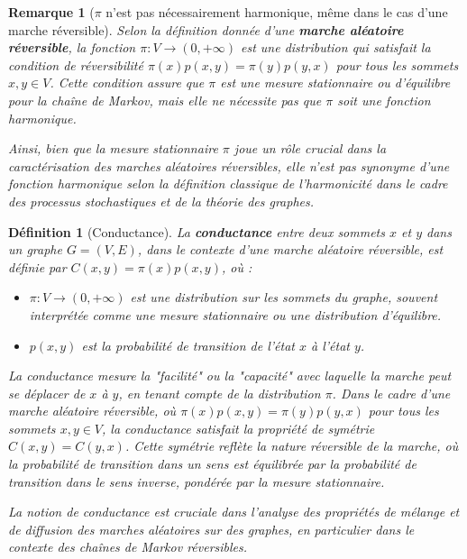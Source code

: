 \documentclass{article}
\theoremstyle{pasdepoint}
\newtheorem{definition}{Définition}
\theoremstyle{break}
\theoremstyle{pasdepoint}
\newtheorem*{remark}{Remarque}
\begin{document}
\begin{remark}[\(\pi\) n'est pas nécessairement harmonique, même dans le cas d'une marche réversible]
    
Selon la définition donnée d'une \textbf{marche aléatoire réversible}, la fonction \(\pi : V \rightarrow (0, +\infty)\) est une distribution qui satisfait la condition de réversibilité \(\pi(x)p(x, y) = \pi(y)p(y, x)\) pour tous les sommets \(x, y \in V\). Cette condition assure que \(\pi\) est une mesure stationnaire ou d'équilibre pour la chaîne de Markov, mais elle ne nécessite pas que \(\pi\) soit une fonction harmonique.

Ainsi, bien que la mesure stationnaire \(\pi\) joue un rôle crucial dans la caractérisation des marches aléatoires réversibles, elle n'est pas synonyme d'une fonction harmonique selon la définition classique de l'harmonicité dans le cadre des processus stochastiques et de la théorie des graphes.

\end{remark}

\begin{definition}[Conductance]
La \textbf{conductance} entre deux sommets \(x\) et \(y\) dans un graphe \(G = (V, E)\), dans le contexte d'une marche aléatoire réversible, est définie par \(C(x, y) = \pi(x)p(x, y)\), où :
\begin{itemize}
    \item \(\pi : V \rightarrow (0, +\infty)\) est une distribution sur les sommets du graphe, souvent interprétée comme une mesure stationnaire ou une distribution d'équilibre.
    \item \(p(x, y)\) est la probabilité de transition de l'état \(x\) à l'état \(y\).
\end{itemize}

La conductance mesure la "facilité" ou la "capacité" avec laquelle la marche peut se déplacer de \(x\) à \(y\), en tenant compte de la distribution \(\pi\). Dans le cadre d'une marche aléatoire réversible, où \(\pi(x)p(x, y) = \pi(y)p(y, x)\) pour tous les sommets \(x, y \in V\), la conductance satisfait la propriété de symétrie \(C(x, y) = C(y, x)\). Cette symétrie reflète la nature réversible de la marche, où la probabilité de transition dans un sens est équilibrée par la probabilité de transition dans le sens inverse, pondérée par la mesure stationnaire.

La notion de conductance est cruciale dans l'analyse des propriétés de mélange et de diffusion des marches aléatoires sur des graphes, en particulier dans le contexte des chaînes de Markov réversibles.
\end{definition}
\end{document}
